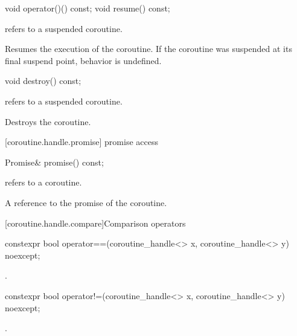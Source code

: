 \begin{itemdecl}
void operator()() const;
void resume() const;	
\end{itemdecl}

\begin{itemdescr}
\pnum
\requires {} refers to a suspended coroutine.
  
\pnum
\effects Resumes the execution of the coroutine. If the coroutine
was suspended at its final suspend point, behavior is undefined.
\end{itemdescr}

\begin{itemdecl}
void destroy() const;
\end{itemdecl}

\begin{itemdescr}
\pnum
\requires {} refers to a suspended coroutine.
  
\pnum
\effects Destroys the coroutine.
\end{itemdescr}

[coroutine.handle.promise]{ promise access}

\begin{itemdecl}
Promise& promise() const;		
\end{itemdecl}

\begin{itemdescr}
\pnum
\requires {} refers to a coroutine.
  
\pnum
\returns A reference to the promise of the coroutine.
\end{itemdescr}

[coroutine.handle.compare]{Comparison operators}

\begin{itemdecl}
constexpr bool operator==(coroutine_handle<> x, coroutine_handle<> y) noexcept;
\end{itemdecl}

\begin{itemdescr}
\pnum \returns {}.
\end{itemdescr}

\begin{itemdecl}
constexpr bool operator!=(coroutine_handle<> x, coroutine_handle<> y) noexcept;
\end{itemdecl}

\begin{itemdescr}
\pnum \returns {}.
\end{itemdescr}

